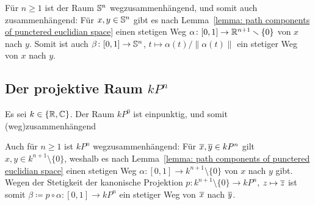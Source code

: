 Für $n \geq 1$ ist der Raum $\mathbb{S}^n$ wegzusammenhängend, und somit auch zusammenhängend:
Für $x, y \in \mathbb{S}^n$ gibt es nach Lemma~\ref{lemma: path components of punctered euclidian space} einen stetigen Weg $\alpha \colon [0,1] \to \mathbb{R}^{n+1} \smallsetminus \{0\}$ von $x$ nach $y$.
Somit ist auch $\beta \colon [0,1] \to \mathbb{S}^n$, $t \mapsto \alpha(t) / \|\alpha(t)\|$ ein stetiger Weg von $x$ nach $y$.





\subsection{Der projektive Raum \texorpdfstring{$kP^n$}{kPn}}

Es sei $k \in \{\mathbb{R}, \mathbb{C}\}$.
Der Raum $kP^0$ ist einpunktig, und somit (weg)zusammenhängend

Auch für $n \geq 1$ ist $kP^n$ wegzusammenhängend:
Für $\overline{x}, \overline{y} \in kP^n$ gilt $x, y \in k^{n+1} \setminus \{0\}$, weshalb es nach Lemma~\ref{lemma: path components of punctered euclidian space} einen stetigen Weg $\alpha \colon [0,1] \to k^{n+1} \setminus \{0\}$ von $x$ nach $y$ gibt.
Wegen der Stetigkeit der kanonische Projektion $p \colon k^{n+1} \setminus \{0\} \to kP^n$, $z \mapsto \overline{z}$ ist somit $\beta \coloneqq p \circ \alpha \colon [0,1] \to kP^n$ ein stetiger Weg von $\overline{x}$ nach $\overline{y}$.











